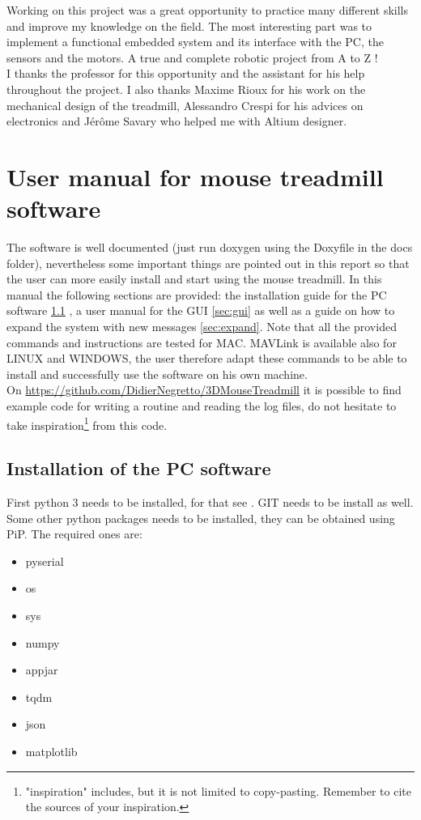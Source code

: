 \documentclass[12pt,a4paper, twoside]{article}
\begin{document}
Working on this project was a great opportunity to practice many different skills and improve my knowledge on the field. The most interesting part was to implement a functional embedded system and its interface with the PC, the sensors and the motors. A true and complete robotic project from A to Z !\\

 I thanks the professor for this opportunity and the assistant for his help throughout the project. I also thanks Maxime Rioux for his work on the mechanical design of the treadmill, Alessandro Crespi for his advices on electronics and Jérôme Savary who helped me with Altium designer.



\newpage
\section[User manual]{User manual for mouse treadmill software}\label{sec:user_manual}
The software is well documented (just run doxygen using the Doxyfile in the docs folder), nevertheless some important things are pointed out in this report so that the user can more easily install and start using the mouse treadmill. In this manual the following sections are provided: the installation guide for the PC software \ref{sec:install} , a user manual for the GUI \ref{sec:gui} as well as a guide on how to expand the system with new messages \ref{sec:expand}. Note that all the provided commands and instructions are tested for MAC. MAVLink is available also for LINUX and WINDOWS, the user therefore adapt these commands to be able to install and successfully use the software on his own machine.\\

On \url{https://github.com/DidierNegretto/3DMouseTreadmill} it is possible to find example code for writing a routine and reading the log files, do not hesitate to take inspiration\footnote{ "inspiration" includes, but it is not limited to copy-pasting. Remember to cite the sources of your inspiration.} from this code.
\subsection{Installation of the PC software}\label{sec:install}
First python 3 needs to be installed, for that see \cite{py}. GIT needs to be install as well. Some other python packages needs to be installed, they can be obtained using PiP. The required ones are:\\
\begin{multicols}{3}[]
	\begin{itemize}
		\item pyserial
		\item os
		\item sys
		\item numpy
		\item appjar
		\item tqdm
		\item json
		\item matplotlib
	\end{itemize}
\end{multicols}
\end{document}
